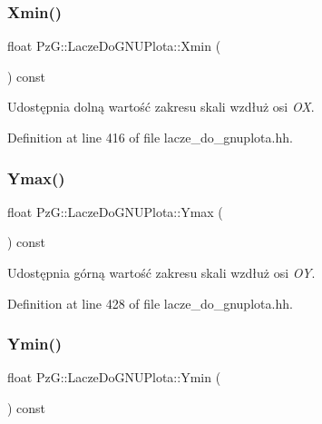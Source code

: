 \subsubsection{\texorpdfstring{Xmin()}{Xmin()}}
{\footnotesize\ttfamily float Pz\+G\+::\+Lacze\+Do\+G\+N\+U\+Plota\+::\+Xmin (\begin{DoxyParamCaption}{ }\end{DoxyParamCaption}) const\hspace{0.3cm}{\ttfamily [inline]}}

Udostępnia dolną wartość zakresu skali wzdłuż osi {\itshape OX}. 

Definition at line 416 of file lacze\+\_\+do\+\_\+gnuplota.\+hh.

\mbox{\label{class_pz_g_1_1_lacze_do_g_n_u_plota_ac54e4e7448ce3bd324efdc94a999f535}} 
\subsubsection{\texorpdfstring{Ymax()}{Ymax()}}
{\footnotesize\ttfamily float Pz\+G\+::\+Lacze\+Do\+G\+N\+U\+Plota\+::\+Ymax (\begin{DoxyParamCaption}{ }\end{DoxyParamCaption}) const\hspace{0.3cm}{\ttfamily [inline]}}

Udostępnia górną wartość zakresu skali wzdłuż osi {\itshape OY}. 

Definition at line 428 of file lacze\+\_\+do\+\_\+gnuplota.\+hh.

\mbox{\label{class_pz_g_1_1_lacze_do_g_n_u_plota_a9352c0382bfaeaaba9f65399a7383164}} 
\subsubsection{\texorpdfstring{Ymin()}{Ymin()}}
{\footnotesize\ttfamily float Pz\+G\+::\+Lacze\+Do\+G\+N\+U\+Plota\+::\+Ymin (\begin{DoxyParamCaption}{ }\end{DoxyParamCaption}) const\hspace{0.3cm}{\ttfamily [inline]}}

